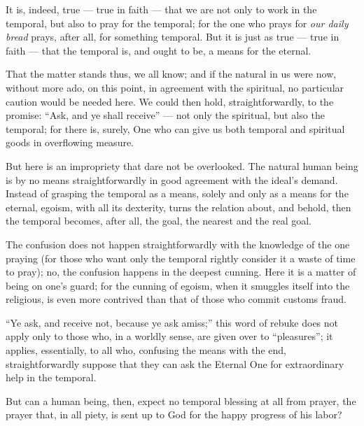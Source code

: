 \documentclass[12pt,a4paper]{book}
\begin{document}
It is, indeed, true --- true in faith --- that we are not only to work in the temporal, but also to pray for the temporal; for the one who prays for \emph{our daily bread} prays, after all, for something temporal. But it is just as true --- true in faith --- that the temporal is, and ought to be, a means for the eternal.

That the matter stands thus, we all know; and if the natural in us were now, without more ado, on this point, in agreement with the spiritual, no particular caution would be needed here. We could then hold, straightforwardly, to the promise: ``Ask, and ye shall receive'' --- not only the spiritual, but
also the temporal; for there is, surely, One who can give us both temporal and spiritual goods in overflowing measure.

But here is an impropriety that dare not be overlooked. The natural human being is by no means straightforwardly in good agreement with the ideal's demand. Instead of grasping the temporal as a means, solely and only as a means for the eternal, egoism, with all its dexterity, turns the relation about, and behold, then the temporal becomes, after all, the goal, the nearest and the real goal.

The confusion does not happen straightforwardly with the knowledge of the one praying (for those who want only the temporal rightly consider it a waste of time to pray); no, the confusion happens in the deepest cunning. Here it is a matter of being on one's guard; for the cunning of egoism, when it smuggles itself into the religious, is even more contrived than that of those who commit customs fraud.

``Ye ask, and receive not, because ye ask amiss;'' this word of rebuke does not apply only to those who, in a worldly sense, are given over to ``pleasures''; it applies, essentially, to all who, confusing the means with the end, straightforwardly suppose that they can ask the Eternal One for extraordinary help in the temporal.

But can a human being, then, expect no temporal blessing at all from prayer, the prayer that, in all piety, is sent up to God for the happy progress of his labor?
\end{document}
